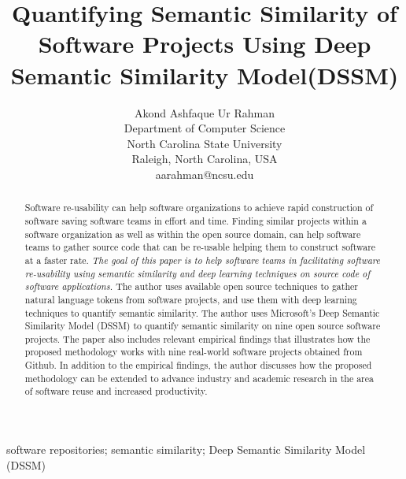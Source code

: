 \documentclass[conference]{IEEEtran}
\begin{document}
\title{Quantifying Semantic Similarity of Software Projects Using Deep Semantic Similarity Model(DSSM)}




\author{
    Akond Ashfaque Ur Rahman\\
    Department of Computer Science\\
    North Carolina State University\\
    Raleigh, North Carolina, USA\\
    aarahman@ncsu.edu 

}


\maketitle

\begin{abstract}


Software re-usability can help software organizations to achieve rapid construction of software saving software teams in effort and time. Finding similar projects within a software organization as well as within the open source domain, can help software teams to gather source code that can be re-usable helping them to construct software at a faster rate. \textit{The goal of this paper is to help software teams in facilitating software re-usability using semantic similarity and deep learning techniques on source code of software applications.} The author uses available open source techniques to gather natural language tokens from software projects, and use them with deep learning techniques to quantify semantic similarity. The author uses Microsoft's Deep Semantic Similarity Model (DSSM) to quantify semantic similarity on nine open source software projects. The paper also includes relevant empirical findings that illustrates how the proposed methodology works with nine real-world software projects obtained from Github. In addition to the empirical findings, the author discusses how the proposed methodology can be extended to advance industry and academic research in the area of software reuse and increased productivity.   


\end{abstract}


\IEEEpeerreviewmaketitle

\begin{IEEEkeywords} 

software repositories; semantic similarity; Deep Semantic Similarity Model (DSSM)

\end{IEEEkeywords}
\end{document}
